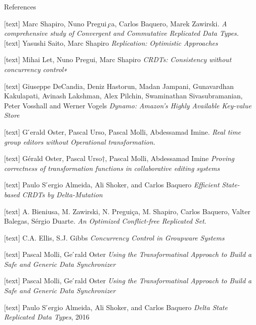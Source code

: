 \documentclass{beamer}
\begin{document}
\begin{frame}{References}

\begin{thebibliography}{9}
[text]
Marc Shapiro, Nuno Pregui ̧ca, Carlos Baquero, Marek Zawirski. 
\textit{A comprehensive study of Convergent and Commutative Replicated Data Types.}
[text]
Yasushi Saito, Marc Shapiro
\textit{Replication: Optimistic Approaches}

[text]
Mihai Let, Nuno Pregui, Marc Shapiro
\textit{CRDTs: Consistency without concurrency control∗}

[text]
Giuseppe DeCandia, Deniz Hastorun, Madan Jampani, Gunavardhan Kakulapati, Avinash Lakshman, Alex Pilchin, Swaminathan Sivasubramanian, Peter Vosshall and Werner Vogels
\textit{Dynamo: Amazon’s Highly Available Key-value Store}

[text]
G ́erald Oster, Pascal Urso, Pascal Molli, Abdessamad Imine. 
\textit{Real time group editors without Operational transformation.}

[text]
Gérald Oster, Pascal Urso†, Pascal Molli, Abdessamad Imine
\textit{Proving correctness of transformation functions in collaborative editing systems}

\end{thebibliography}	

\end{frame}




\begin{frame}
\begin{thebibliography}{99}

[text]
Paulo S ́ergio Almeida, Ali Shoker, and Carlos Baquero
\textit{Efficient State-based CRDTs by Delta-Mutation}

[text]
A. Bieniusa, M. Zawirski, N. Preguiça, M. Shapiro, Carlos Baquero, Valter Balegas, Sérgio Duarte.
\textit{An Optimized Conflict-free Replicated Set.}

[text]
C.A. Ellis, S.J. Gibbs
\textit{Concurrency Control in Groupware Systems}

[text]
Pascal Molli, Ge ́rald Oster
\textit{Using the Transformatinal Approach to Build a Safe and Generic Data Synchronizer}


[text]
Pascal Molli, Ge ́rald Oster
\textit{Using the Transformatinal Approach to Build a Safe and Generic Data Synchronizer}

[text]
Paulo S ́ergio Almeida, Ali Shoker, and Carlos Baquero
\textit{Delta State Replicated Data Types}, 2016


\end{thebibliography}	
\end{frame}
\end{document}
